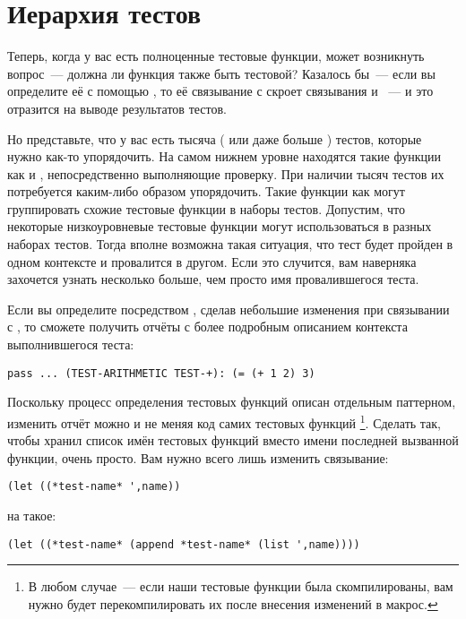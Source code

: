 \section{Иерархия тестов}

Теперь, когда у вас есть полноценные тестовые функции, может возникнуть вопрос~--- должна
ли функция  также быть тестовой? Казалось бы~--- если вы определите
её с помощью , то её связывание с  скроет связывания
 и ~--- и это отразится на выводе результатов тестов.

Но представьте, что у вас есть тысяча ( или даже больше ) тестов, которые нужно как-то
упорядочить. На самом нижнем уровне находятся такие функции как  и
, непосредственно выполняющие проверку. При наличии тысяч тестов их
потребуется каким-либо образом упорядочить. Такие функции как  могут
группировать схожие тестовые функции в наборы тестов. Допустим, что некоторые
низкоуровневые тестовые функции могут использоваться в разных наборах тестов. Тогда вполне
возможна такая ситуация, что тест будет пройден в одном контексте и провалится в
другом. Если это случится, вам наверняка захочется узнать несколько больше, чем просто имя
провалившегося теста.

Если вы определите  посредством , сделав небольшие
изменения при связывании с , то сможете получить отчёты с более
подробным описанием контекста выполнившегося теста:

\begin{lstlisting}
pass ... (TEST-ARITHMETIC TEST-+): (= (+ 1 2) 3)
\end{lstlisting}

Поскольку процесс определения тестовых функций описан отдельным паттерном, изменить отчёт
можно и не меняя код самих тестовых функций \footnote{В любом случае~--- если наши
  тестовые функции была скомпилированы, вам нужно будет перекомпилировать их после
  внесения изменений в макрос.}. Сделать так, чтобы  хранил список имён
тестовых функций вместо имени последней вызванной функции, очень просто. Вам нужно всего
лишь изменить связывание:

\begin{lstlisting}
(let ((*test-name* ',name))
\end{lstlisting}

на такое:

\begin{lstlisting}
(let ((*test-name* (append *test-name* (list ',name))))
\end{lstlisting}

